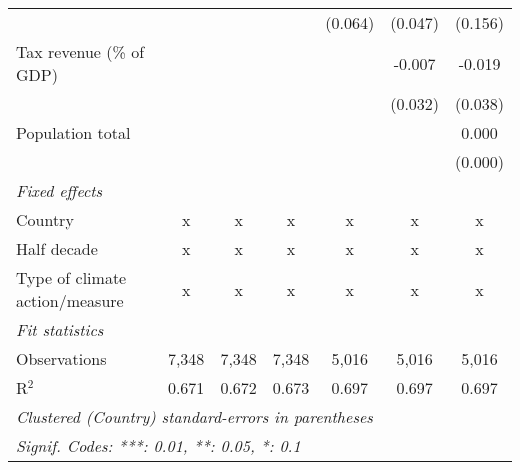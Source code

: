 \begin{tabular}{lcccccc}
                                                  &               &                &                & (0.064)        & (0.047)        & (0.156)\\   
   Tax revenue (\% of GDP)                        &               &                &                &                & -0.007         & -0.019\\   
                                                  &               &                &                &                & (0.032)        & (0.038)\\   
   Population total                               &               &                &                &                &                & 0.000\\   
                                                  &               &                &                &                &                & (0.000)\\   
   \emph{Fixed effects}\\
   Country                                        & x             & x              & x              & x              & x              & x\\  
   Half decade                                    & x             & x              & x              & x              & x              & x\\  
   Type of climate action/measure                 & x             & x              & x              & x              & x              & x\\  
   \midrule \emph{Fit statistics}\\
   Observations                                   & 7,348         & 7,348          & 7,348          & 5,016          & 5,016          & 5,016\\  
   R$^2$                                          & 0.671         & 0.672          & 0.673          & 0.697          & 0.697          & 0.697\\  
   \midrule
   \multicolumn{7}{l}{\emph{Clustered (Country) standard-errors in parentheses}}\\
   \multicolumn{7}{l}{\emph{Signif. Codes: ***: 0.01, **: 0.05, *: 0.1}}\\
\end{tabular}
\par\endgroup


